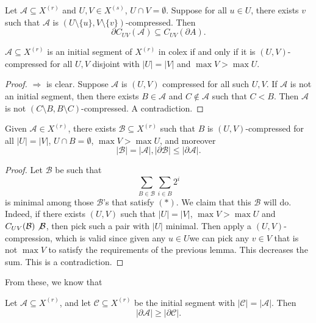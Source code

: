 \documentclass[a4paper]{article}
\begin{document}
\begin{lemma}
  Let $\mathcal{A} \subseteq X^{(r)}$ and $U, V \in X^{(s)}$, $U \cap V = \emptyset$. Suppose for all $u \in U$, there exists $v$ such that $\mathcal{A}$ is $(U \setminus \{u\}, V \setminus \{v\})$-compressed. Then
  \[
    \partial C_{UV} (\mathcal{A}) \subseteq C_{UV}(\partial A).
  \]
\end{lemma}

\begin{lemma}
  $\mathcal{A} \subseteq X^{(r)}$ is an initial segment of $X^{(r)}$ in colex if and only if it is $(U, V)$-compressed for all $U, V$ disjoint with $|U| = |V|$ and $\max V > \max U$.
\end{lemma}

\begin{proof}
  $\Rightarrow$ is clear. Suppose $\mathcal{A}$ is $(U, V)$ compressed for all such $U, V$. If $\mathcal{A}$ is not an initial segment, then there exists $B \in \mathcal{A}$ and $C \not \in \mathcal{A}$ such that $C < B$. Then $\mathcal{A}$ is not $(C \setminus B, B \setminus C)$-compressed. A contradiction.
\end{proof}

\begin{lemma}
  Given $\mathcal{A} \in X^{(r)}$, there exists $\mathcal{B} \subseteq X^{(r)}$ such that $B$ is $(U, V)$-compressed for all $|U| = |V|$, $U \cap B= \emptyset$, $\max V > \max U$, and moreover
  \[
    |\mathcal{B}| = |\mathcal{A}|, |\partial \mathcal{B}| \leq |\partial \mathcal{A}|.\tag{$*$}
  \]
\end{lemma}

\begin{proof}
  Let $\mathcal{B}$ be such that
  \[
    \sum_{B \in \mathcal{B}} \sum_{i \in B} 2^i
  \]
  is minimal among those $\mathcal{B}$'s that satisfy $(*)$. We claim that this $\mathcal{B}$ will do. Indeed, if there exists $(U, V)$ such that $|U| = |V|$, $\max V > \max U$ and $C_{UV}(\mathcal{B}) \not \mathcal{B}$, then pick such a pair with $|U|$ minimal. Then apply a $(U, V)$-compression, which is valid since given any $u \in U$we can pick any $v \in V$ that is not $\max V$ to satisfy the requirements of the previous lemma. This decreases the sum. This is a contradiction.
\end{proof}

From these, we know that
\begin{thm}
  Let $\mathcal{A} \subseteq X^{(r)}$, and let $\mathcal{C} \subseteq X^{(r)}$ be the initial segment with $|\mathcal{C}| = |\mathcal{A}|$. Then
  \[
    |\partial \mathcal{A}| \geq |\partial \mathcal{C}|.
  \]
\end{thm}
\end{document}
